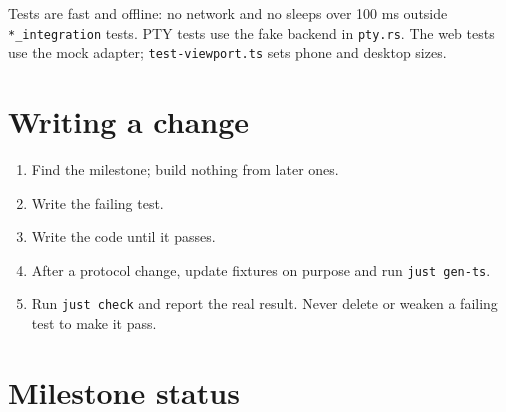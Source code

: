 Tests are fast and offline: no network and no sleeps over 100 ms outside \texttt{*\_\allowbreak{}integration} tests. PTY tests use the fake backend in \texttt{pty.\allowbreak{}rs}. The web tests use the mock adapter; \texttt{test-{}\allowbreak{}viewport.\allowbreak{}ts} sets phone and desktop sizes.

\section{\texorpdfstring{Writing a change}{Writing a change}}

\begin{enumerate}
\item Find the milestone; build nothing from later ones.
\item Write the failing test.
\item Write the code until it passes.
\item After a protocol change, update fixtures on purpose and run \texttt{just\ gen-{}\allowbreak{}ts}.
\item Run \texttt{just\ check} and report the real result. Never delete or weaken a failing test to make it pass.
\end{enumerate}

\section{\texorpdfstring{Milestone status}{Milestone status}}

